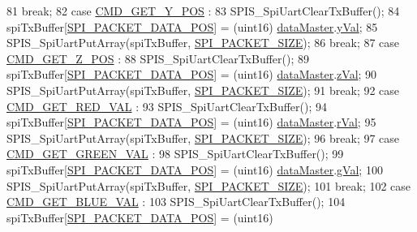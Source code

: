 \begin{DoxyCode}
{{81           \textcolor{keywordflow}{break};
82         \textcolor{keywordflow}{case} \hyperlink{handler_8h_a51053e5251048d6ebbf4d2e23de40761}{CMD\_GET\_Y\_POS} :
83           SPIS\_SpiUartClearTxBuffer();
84           spiTxBuffer[\hyperlink{spi_8h_a5ffe58623f478b7b960a1349530a6655}{SPI\_PACKET\_DATA\_POS}] = (uint16)
      \hyperlink{data_8h_a6b1a8871e30b304a6f5764c44d89e489}{dataMaster}.\hyperlink{data_8h_a28e89368b5a1aee30ccd952ad63e8c55}{yVal};
85           SPIS\_SpiUartPutArray(spiTxBuffer, \hyperlink{spi_8h_aea54fc09a960e5a1b7096374f3eebee4}{SPI\_PACKET\_SIZE});
86           \textcolor{keywordflow}{break};
87         \textcolor{keywordflow}{case} \hyperlink{handler_8h_a4d76e78d09a00f75609569d9aa92ab98}{CMD\_GET\_Z\_POS} :
88           SPIS\_SpiUartClearTxBuffer();
89           spiTxBuffer[\hyperlink{spi_8h_a5ffe58623f478b7b960a1349530a6655}{SPI\_PACKET\_DATA\_POS}] = (uint16)
      \hyperlink{data_8h_a6b1a8871e30b304a6f5764c44d89e489}{dataMaster}.\hyperlink{data_8h_a767a084c35fdc0f1e3e41972d5415483}{zVal};
90           SPIS\_SpiUartPutArray(spiTxBuffer, \hyperlink{spi_8h_aea54fc09a960e5a1b7096374f3eebee4}{SPI\_PACKET\_SIZE});
91           \textcolor{keywordflow}{break};
92         \textcolor{keywordflow}{case} \hyperlink{handler_8h_aa2f09e60c4eeae4560da88c6b1b08c60}{CMD\_GET\_RED\_VAL} :
93           SPIS\_SpiUartClearTxBuffer();
94           spiTxBuffer[\hyperlink{spi_8h_a5ffe58623f478b7b960a1349530a6655}{SPI\_PACKET\_DATA\_POS}] = (uint16)
      \hyperlink{data_8h_a6b1a8871e30b304a6f5764c44d89e489}{dataMaster}.\hyperlink{data_8h_a3bf14030a39e71a91c0b97a624f95c5d}{rVal};
95           SPIS\_SpiUartPutArray(spiTxBuffer, \hyperlink{spi_8h_aea54fc09a960e5a1b7096374f3eebee4}{SPI\_PACKET\_SIZE});
96           \textcolor{keywordflow}{break};
97         \textcolor{keywordflow}{case} \hyperlink{handler_8h_a55d24f50aeb52afddd491d97a66c81ef}{CMD\_GET\_GREEN\_VAL} :
98           SPIS\_SpiUartClearTxBuffer();
99           spiTxBuffer[\hyperlink{spi_8h_a5ffe58623f478b7b960a1349530a6655}{SPI\_PACKET\_DATA\_POS}] = (uint16)
      \hyperlink{data_8h_a6b1a8871e30b304a6f5764c44d89e489}{dataMaster}.\hyperlink{data_8h_ae02d0c792549f1b88e80ae6eb117f2be}{gVal};
100           SPIS\_SpiUartPutArray(spiTxBuffer, \hyperlink{spi_8h_aea54fc09a960e5a1b7096374f3eebee4}{SPI\_PACKET\_SIZE});
101           \textcolor{keywordflow}{break};
102         \textcolor{keywordflow}{case} \hyperlink{handler_8h_a81052c67f996705d7eacfcea66bdde08}{CMD\_GET\_BLUE\_VAL} :
103           SPIS\_SpiUartClearTxBuffer();
104           spiTxBuffer[\hyperlink{spi_8h_a5ffe58623f478b7b960a1349530a6655}{SPI\_PACKET\_DATA\_POS}] = (uint16)
}}
\end{DoxyCode}
